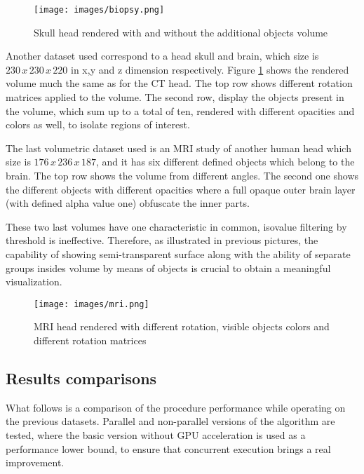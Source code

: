 \documentclass[12pt,a4paper]{extarticle}
\newcommand{\linespace}{\vspace{0pt}}
\begin{document}
\begin{figure}[hbtp]
\centering
\texttt{[image: images/biopsy.png]}
\caption{Skull head rendered with and without the additional objects volume}
\label{fig:biopsy}
\end{figure}


Another dataset used correspond to a head skull and brain, which size is $230\,x\,230\,x\,220$ in x,y and z dimension respectively.
Figure \ref{fig:biopsy} shows the rendered volume much the same as for the CT head. The top row shows different rotation matrices applied to the volume. The second row, display the objects present in the volume, which sum up to a total of ten, rendered with different opacities and colors as well, to isolate regions of interest.
\linespace

The last volumetric dataset used is an MRI study of another human head which size is $176\,x\,236\,x\,187$, and it has six different defined objects which belong to the brain. The top row shows the volume from different angles. The second one shows the different objects with different opacities where a full opaque outer brain layer (with defined alpha value one) obfuscate the inner parts.
\linespace 

These two last volumes have one characteristic in common, isovalue filtering by threshold is ineffective. Therefore, as illustrated in previous pictures, the capability of showing semi-transparent surface along with the ability of separate groups insides volume by means of objects is crucial to obtain a meaningful visualization.
\pagebreak

\begin{figure}[hbtp]
\centering
\texttt{[image: images/mri.png]}
\caption{MRI head rendered with different rotation, visible objects colors and different rotation matrices }
\label{fig:mri}
\end{figure}
\subsection{Results comparisons} 
What follows is a comparison of the procedure performance while operating on the previous datasets. Parallel and non-parallel versions of the algorithm are tested, where the basic version without GPU acceleration is used as a performance lower bound, to ensure that concurrent execution brings a real improvement.
\end{document}
